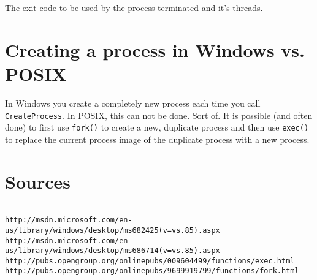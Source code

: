 \documentclass[a4]{article}
\begin{document}
The exit code to be used by the process terminated and it's threads.

\section{Creating a process in Windows vs. POSIX}

In Windows you create a completely new process each time you call \texttt{CreateProcess}. In POSIX, this can not be done. Sort of. It is possible (and often done) to first use \texttt{fork()} to create a new, duplicate process and then use \texttt{exec()} to replace the current process image of the duplicate process with a new process.

\section*{Sources}

\begin{verbatim}

http://msdn.microsoft.com/en-us/library/windows/desktop/ms682425(v=vs.85).aspx
http://msdn.microsoft.com/en-us/library/windows/desktop/ms686714(v=vs.85).aspx
http://pubs.opengroup.org/onlinepubs/009604499/functions/exec.html
http://pubs.opengroup.org/onlinepubs/9699919799/functions/fork.html

\end{verbatim}
\end{document}
